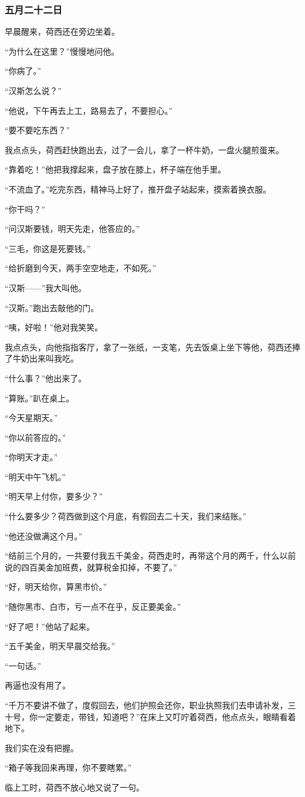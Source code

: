 \subsubsection{五月二十二日}
\par 早晨醒来，荷西还在旁边坐着。
\par “为什么在这里？”慢慢地问他。
\par “你病了。”
\par “汉斯怎么说？”
\par “他说，下午再去上工，路易去了，不要担心。”
\par “要不要吃东西？”
\par 我点点头，荷西赶快跑出去，过了一会儿，拿了一杯牛奶，一盘火腿煎蛋来。
\par “靠着吃！”他把我撑起来，盘子放在膝上，杯子端在他手里。
\par “不流血了。”吃完东西，精神马上好了，推开盘子站起来，摸索着换衣服。
\par “你干吗？”
\par “问汉斯要钱，明天先走，他答应的。”
\par “三毛，你这是死要钱。”
\par “给折磨到今天，两手空空地走，不如死。”
\par “汉斯——”我大叫他。
\par “汉斯。”跑出去敲他的门。
\par “咦，好啦！”他对我笑笑。
\par 我点点头，向他指指客厅，拿了一张纸，一支笔，先去饭桌上坐下等他，荷西还捧了牛奶出来叫我吃。
\par “什么事？”他出来了。
\par “算账。”趴在桌上。
\par “今天星期天。”
\par “你以前答应的。”
\par “你明天才走。”
\par “明天中午飞机。”
\par “明天早上付你，要多少？”
\par “什么要多少？荷西做到这个月底，有假回去二十天，我们来结账。”
\par “他还没做满这个月。”
\par “结前三个月的，一共要付我五千美金，荷西走时，再带这个月的两千，什么以前说的四百美金加班费，就算税金扣掉，不要了。”
\par “好，明天给你，算黑市价。”
\par “随你黑市、白市，亏一点不在乎，反正要美金。”
\par “好了吧！”他站了起来。
\par “五千美金，明天早晨交给我。”
\par “一句话。”
\par 再逼也没有用了。
\par “千万不要讲不做了，度假回去，他们护照会还你，职业执照我们去申请补发，三十号，你一定要走，带钱，知道吧？”在床上又叮咛着荷西，他点点头，眼睛看着地下。
\par 我们实在没有把握。
\par “箱子等我回来再理，你不要瞎累。”
\par 临上工时，荷西不放心地又说了一句。



